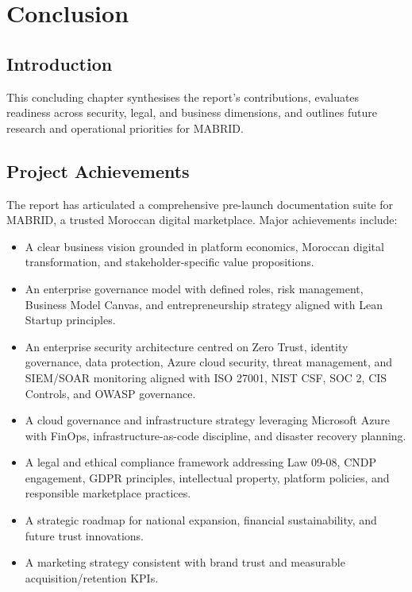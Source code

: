 \chapter{Conclusion}
\label{ch:conclusion}

\section{Introduction}

This concluding chapter synthesises the report's contributions, evaluates readiness across security, legal, and business dimensions, and outlines future research and operational priorities for MABRID.

\section{Project Achievements}

The report has articulated a comprehensive pre-launch documentation suite for MABRID, a trusted Moroccan digital marketplace. Major achievements include:

\begin{itemize}
  \item A clear business vision grounded in platform economics, Moroccan digital transformation, and stakeholder-specific value propositions.
  \item An enterprise governance model with defined roles, risk management, Business Model Canvas, and entrepreneurship strategy aligned with Lean Startup principles.
  \item An enterprise security architecture centred on Zero Trust, identity governance, data protection, Azure cloud security, threat management, and SIEM/SOAR monitoring aligned with ISO 27001, NIST CSF, SOC 2, CIS Controls, and OWASP governance.
  \item A cloud governance and infrastructure strategy leveraging Microsoft Azure with FinOps, infrastructure-as-code discipline, and disaster recovery planning.
  \item A legal and ethical compliance framework addressing Law 09-08, CNDP engagement, GDPR principles, intellectual property, platform policies, and responsible marketplace practices.
  \item A strategic roadmap for national expansion, financial sustainability, and future trust innovations.
  \item A marketing strategy consistent with brand trust and measurable acquisition/retention KPIs.
\end{itemize}

